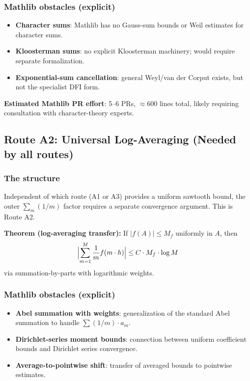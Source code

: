 \documentclass[11pt,a4paper]{article}
\begin{document}
\subsubsection{Mathlib obstacles (explicit)}

\begin{itemize}
\item \textbf{Character sums}: Mathlib has no Gauss-sum bounds or Weil estimates for character sums.
\item \textbf{Kloosterman sums}: no explicit Kloosterman machinery; would require separate formalization.
\item \textbf{Exponential-sum cancellation}: general Weyl/van der Corput exists, but not the specialist DFI form.
\end{itemize}

\textbf{Estimated Mathlib PR effort}: 5--6 PRs, $\approx 600$ lines total, likely requiring consultation with character-theory experts.

\subsection{Route A2: Universal Log-Averaging (Needed by all routes)}

\label{sec:a2}

\subsubsection{The structure}

Independent of which route (A1 or A3) provides a uniform sawtooth bound, the outer $\sum_m (1/m)$ factor requires a separate convergence argument. This is Route A2.

\textbf{Theorem (log-averaging transfer):} If $|f(A)| \le M_f$ uniformly in $A$, then
\[
\Bigl|\sum_{m=1}^{M} \frac{1}{m} f(m \cdot h)\Bigr| \le C \cdot M_f \cdot \log M
\]
via summation-by-parts with logarithmic weights.

\subsubsection{Mathlib obstacles (explicit)}

\begin{itemize}
\item \textbf{Abel summation with weights}: generalization of the standard Abel summation to handle $\sum (1/m) \cdot a_m$.
\item \textbf{Dirichlet-series moment bounds}: connection between uniform coefficient bounds and Dirichlet series convergence.
\item \textbf{Average-to-pointwise shift}: transfer of averaged bounds to pointwise estimates.
\end{itemize}
\end{document}
